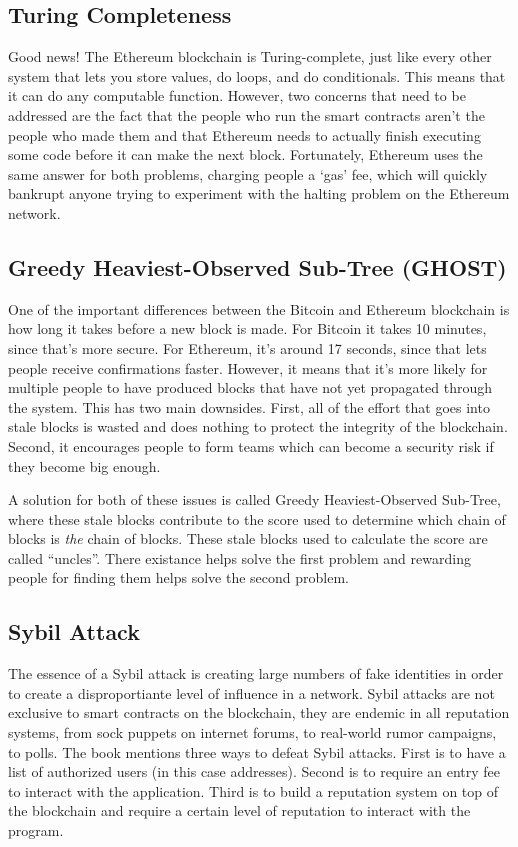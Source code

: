\documentclass{article}
\begin{document}
\subsection{Turing Completeness}
Good news! The Ethereum blockchain is Turing-complete, just like every other system that lets you store values, do loops, and do conditionals. This means that it can do any computable function. However, two concerns that need to be addressed are the fact that the people who run the smart contracts aren't the people who made them and that Ethereum needs to actually finish executing some
code before it can make the next block. Fortunately, Ethereum uses the same answer for both problems, charging people a `gas' fee,
which will quickly bankrupt anyone trying to experiment with the halting problem on the Ethereum network.

\subsection{Greedy Heaviest-Observed Sub-Tree (GHOST)}
One of the important differences between the Bitcoin and Ethereum blockchain is how long it takes before a new block is made.
For Bitcoin it takes 10 minutes, since that's more secure. For Ethereum, it's around 17 seconds, since that lets people receive
confirmations faster. However, it means that it's more likely for multiple people to have produced blocks that have not yet propagated through the system. This has two main downsides. First, all of the effort that goes into stale blocks is wasted and does nothing to
protect the integrity of the blockchain. Second, it encourages people to form teams which can become a security risk if they become
big enough.

A solution for both of these issues is called Greedy Heaviest-Observed Sub-Tree, where these stale blocks contribute to the score
used to determine which chain of blocks is \textit{the} chain of blocks. These stale blocks used to calculate the score are called
``uncles''. There existance helps solve the first problem and rewarding people for finding them helps solve the second problem.

\subsection{Sybil Attack}
The essence of a Sybil attack is creating large numbers of fake identities in order to create a disproportiante level of influence
in a network. Sybil attacks are not exclusive to smart contracts on the blockchain, they are endemic in all reputation systems, from
sock puppets on internet forums, to real-world rumor campaigns, to polls. The book mentions three ways to defeat Sybil attacks.
First is to have a list of authorized users (in this case addresses). Second is to require an entry fee to interact with the application.
Third is to build a reputation system on top of the blockchain and require a certain level of reputation to interact with the program.
\end{document}
